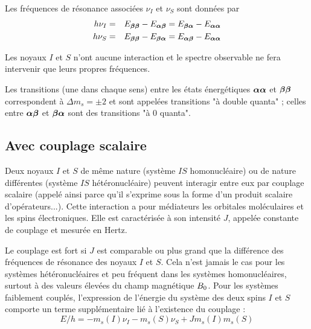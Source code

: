 Les fréquences de résonance associées $\nu_I$ et $\nu_S$ sont données par
\begin{eqnarray}
h \nu_I & = & E_{\boldsymbol{\beta}\boldsymbol{\beta}} - E_{\boldsymbol{\alpha}\boldsymbol{\beta}} = E_{\boldsymbol{\beta}\boldsymbol{\alpha}} - E_{\boldsymbol{\alpha}\boldsymbol{\alpha}}\\
h \nu_S & = & E_{\boldsymbol{\beta}\boldsymbol{\beta}} - E_{\boldsymbol{\beta}\boldsymbol{\alpha}} = E_{\boldsymbol{\alpha}\boldsymbol{\beta}} - E_{\boldsymbol{\alpha}\boldsymbol{\alpha}}
\end{eqnarray}

Les noyaux $I$ et $S$ n'ont aucune interaction et le spectre observable
ne fera intervenir que leurs propres fréquences.

Les transitions (une dans chaque sens) entre les états énergétiques 
$\boldsymbol{\alpha}\boldsymbol{\alpha}$ et $\boldsymbol{\beta}\boldsymbol{\beta}$ correspondent à $\Delta m_s = \pm 2$ et sont
appelées transitions "à double quanta" ;
celles entre $\boldsymbol{\alpha}\boldsymbol{\beta}$ et $\boldsymbol{\beta}\boldsymbol{\alpha}$ sont des transitions "à 0 quanta".

\subsection{Avec couplage scalaire}

Deux noyaux $I$ et $S$ de même nature (système $IS$ homonucléaire) ou de nature 
différentes (système $IS$ hétéronucléaire) peuvent interagir entre eux par couplage 
scalaire (appelé ainsi parce qu'il s'exprime sous la forme d'un produit scalaire d'opérateurs...).
Cette interaction a pour médiateurs les orbitales moléculaires et les spins électroniques.
Elle est caractérisée à son intensité $J$, appelée constante de couplage
et mesurée en Hertz.

Le couplage est fort si $J$ est comparable ou plus grand 
que la différence des fréquences de résonance des noyaux $I$ et $S$. 
Cela n'est jamais le cas 
pour les systèmes hétéronucléaires et peu fréquent dans les systèmes homonucléaires, 
surtout à des valeurs élevées du champ magnétique $B_0$.
Pour les systèmes faiblement couplés, l'expression de l'énergie
du système des deux spins $I$ et $S$ comporte un terme supplémentaire
lié à l'existence du couplage :
\begin{equation}
E/h = -m_s(I)\nu_I -m_s(S)\nu_S + Jm_s(I)m_s(S)
\end{equation}


